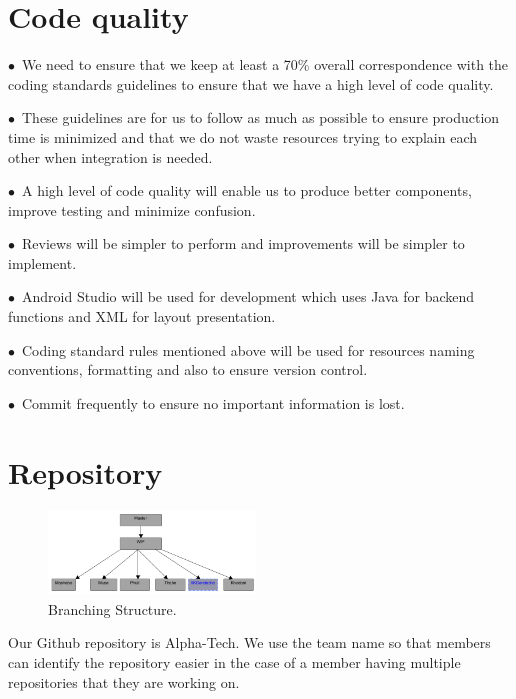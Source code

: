 \documentclass[english]{article}
\begin{document}
\section{Code quality}
$\bullet$\ We need to ensure that we keep at least a 70\% overall correspondence with the coding standards guidelines to ensure that we have a high level of code quality.\par

$\bullet$\ These guidelines are for us to follow as much as possible to ensure production time is minimized and that we do not waste resources trying to explain each other when integration is needed.\par
$\bullet$\ A high level of code quality will enable us to produce better components, improve testing and minimize confusion. \par 
$\bullet$\ Reviews will be simpler to perform and improvements will be simpler to implement.\par

$\bullet$\ Android Studio will be used for development which uses Java for backend functions and XML for layout presentation. \par
$\bullet$\ Coding standard rules mentioned above will be used for resources naming conventions, formatting and also to ensure version control.
 \par
 $\bullet$\ Commit frequently to ensure no important information is lost.
 \par

\section{Repository}
\begin{figure}
	\caption{Branching Structure.}
	\label{wrap-fig:7}
	\includegraphics[width=5.5cm]{images/Branching.png}
\end{figure}
Our Github repository is Alpha-Tech. We use the team name so that members can identify the repository easier in the case of a member having multiple repositories that they are working on. 
\end{document}
